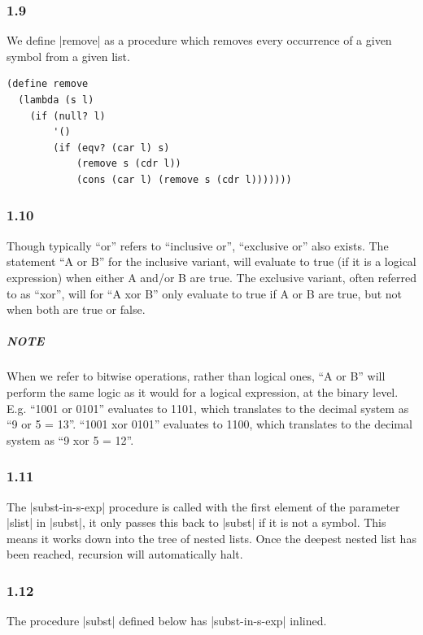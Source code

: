 \documentclass[a4paper]{article}
\begin{document}
\subsubsection*{1.9}

We define |remove| as a procedure which removes every occurrence of a given symbol from a given list.

\begin{lstlisting}
(define remove
  (lambda (s l)
    (if (null? l)
        '()
        (if (eqv? (car l) s)
            (remove s (cdr l))
            (cons (car l) (remove s (cdr l)))))))
\end{lstlisting}

\subsubsection*{1.10}

Though typically ``or'' refers to ``inclusive or'', ``exclusive or'' also exists. The statement ``A or B'' for the inclusive variant, will evaluate to true (if it is a logical expression) when either A and/or B are true. The exclusive variant, often referred to as ``xor'', will for ``A xor B'' only evaluate to true if A or B are true, but not when both are true or false.

\subparagraph{NOTE} When we refer to bitwise operations, rather than logical ones, ``A or B'' will perform the same logic as it would for a logical expression, at the binary level. E.g. ``1001 or 0101'' evaluates to 1101, which translates to the decimal system as ``9 or 5 = 13''. ``1001 xor 0101'' evaluates to 1100, which translates to the decimal system as ``9 xor 5 = 12''.

\subsubsection*{1.11}

The |subst-in-s-exp| procedure is called with the first element of the parameter |slist| in |subst|, it only passes this back to |subst| if it is not a symbol. This means it works down into the tree of nested lists. Once the deepest nested list has been reached, recursion will automatically halt.

\subsubsection*{1.12}

The procedure |subst| defined below has |subst-in-s-exp| inlined.
\end{document}
